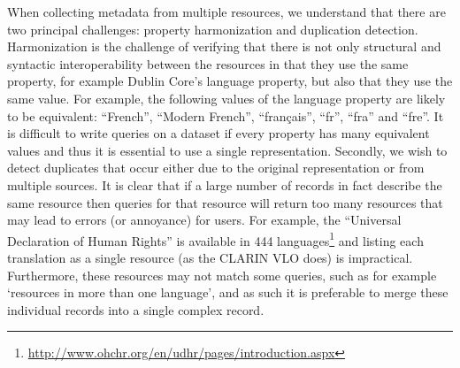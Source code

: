 \documentclass[11pt]{article}
\begin{document}
When collecting metadata from multiple resources, we understand that there are
two principal challenges: property harmonization and duplication detection. Harmonization
is the challenge of verifying that there is not only structural and syntactic 
interoperability between the resources in that they use the same property, for
example Dublin Core's language property, but also that they use the same value.
For example, the following values of the language property are likely to be
equivalent: ``French'', ``Modern French'', ``fran\c{c}ais'', ``fr'', ``fra'' and
``fre''. It is difficult to write queries on a dataset if every property has
many equivalent values and thus it is essential to use a single representation.
Secondly, we wish to detect duplicates that occur either due to the original
representation or from multiple sources. It is clear that if a large number of
records in fact describe the same resource then queries for that resource will
return too many resources that may lead to errors (or annoyance) for users. For
example, the ``Universal Declaration of Human Rights'' is available in 444
languages\footnote{\url{http://www.ohchr.org/en/udhr/pages/introduction.aspx}}
and listing each translation as a single resource (as the CLARIN VLO does) is
impractical. Furthermore, these resources may not match some queries, such as
for example `resources in more than one language', and as such it is preferable to
merge these individual records into a single complex record.
%
\end{document}
